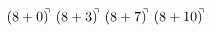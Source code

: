 \documentclass[preview]{standalone}
\begin{document}
\begin{align*}
(8+0)^{\hspace{-0.1cm}\urcorner} \ (8+3)^{\hspace{-0.1cm}\urcorner} \ (8+7)^{\hspace{-0.1cm}\urcorner} \ (8+10)^{\hspace{-0.1cm}\urcorner}
\end{align*}
\end{document}
